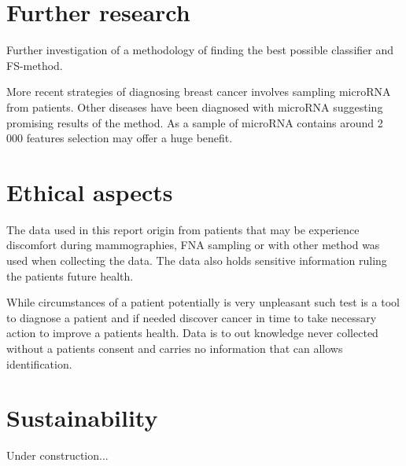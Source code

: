 \section{Further research}

Further investigation of a methodology of finding the best possible classifier and FS-method.

More recent strategies of diagnosing breast cancer involves sampling microRNA from patients. Other diseases have been diagnosed with microRNA suggesting promising results of the method. As a sample of microRNA contains around 2 000 features selection may offer a huge benefit.


\section{Ethical aspects}

The data used in this report origin from patients that may be experience discomfort during mammographies, FNA sampling or with other method was used when collecting the data. The data also holds sensitive information ruling the patients future health.

While circumstances of a patient potentially is very unpleasant such test is a tool to diagnose a patient and if needed discover cancer in time to take necessary action to improve a patients health. Data is to out knowledge never collected without a patients consent and carries no information that can allows identification.

\section{Sustainability}

Under construction...

